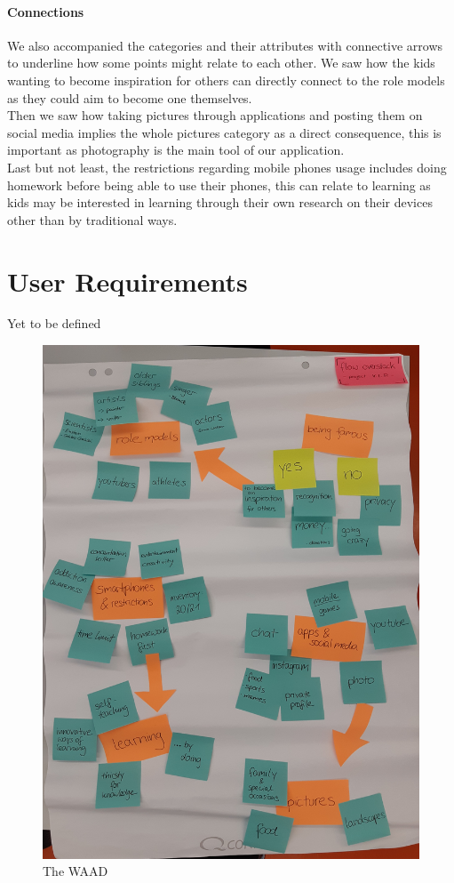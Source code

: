 \documentclass[12pt]{scrartcl}
\begin{document}
	\paragraph{Connections} We also accompanied the categories and their attributes with 
connective arrows to underline how some points might relate to each other. We saw how the kids
wanting to become inspiration for others can directly connect to the role models as they could
aim to become one themselves.\\
Then we saw how taking pictures through applications and posting them on social media implies
the whole pictures category as a direct consequence, this is important as photography is the main
tool of our application.\\
Last but not least, the restrictions regarding mobile phones usage includes doing homework
before being able to use their phones, this can relate to learning as kids may be interested in
learning through their own research on their devices other than by traditional ways.

\section*{User Requirements}
	Yet to be defined
	
	
\begin{figure}[h]
	\includegraphics[width=\textwidth]{WAAD.jpg}
	\caption{The WAAD}
	\label{WAAD}
\end{figure}
\end{document}
